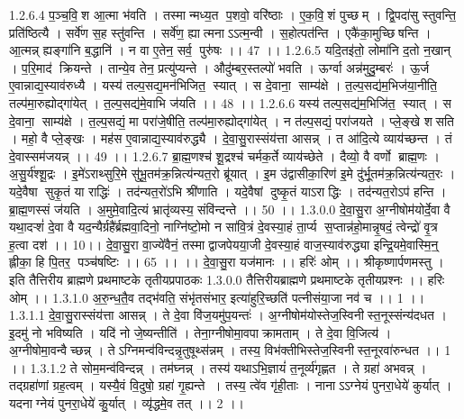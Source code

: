 1.2.6.4
प॒ञ्च॒वि॒॒श आ॒त्मा भ॑वति । तस्मान्मध्य॒त प॒शवो॒ वरि॑ष्ठाः । ए॒क॒वि॒॒शं पुच्छम् । द्वि॒पदा॑सु स्तुवन्ति॒ प्रति॑ष्ठित्यै । सर्वे॑ण स॒ह स्तु॑वन्ति । सर्वे॑ण॒ ह्यात्मनाऽऽत्म॒न्वी । स॒होत्पत॑न्ति । एकै॑का॒मुच्छि॑षन्ति । आ॒त्मन्न् ह्यङ्गा॑नि ब॒द्धानि॑ । न वा ए॒तेन॒ सर्व॒ पुरु॑षः ।। 47 ।।
1.2.6.5
यदि॒तइ॑तो॒ लोमा॑नि द॒तो न॒खान् । प॒रि॒माद॑ क्रियन्ते । तान्ये॒व तेन॒ प्रत्यु॑प्यन्ते । औदु॑म्बर॒स्तल्पो॑ भवति । ऊर्ग्वा अन्न॑मुदु॒म्बरः॑ । ऊ॒र्ज ए॒वान्नाद्य॒स्याव॑रुध्यै । यस्य॑ तल्प॒सद्य॒मन॑भिजित॒॒ स्यात् । स दे॒वाना॒॒ साम्य॑क्षे । त॒ल्प॒सद्य॑म॒भिज॑या॒नीति॒ तल्प॑मा॒रुह्योद्गा॑येत् । त॒ल्प॒सद्य॑मे॒वाभि ज॑यति ।। 48 ।।
1.2.6.6
यस्य॑ तल्प॒सद्य॑म॒भिजि॑त॒॒ स्यात् । स दे॒वाना॒॒ साम्य॑क्षे । त॒ल्प॒सद्यं॒ मा परा॑जे॒षीति॒ तल्प॑मा॒रुह्योद्गा॑येत् । न त॑ल्प॒सद्यं॒ परा॑जयते । प्ले॒ङ्खे श॑सति । महो॒ वै प्ले॒ङ्खः । मह॑स ए॒वान्नाद्य॒स्याव॑रुद्ध्यै । दे॒वा॒सु॒रास्संय॑त्ता आसन्न् । त आ॑दि॒त्ये व्याय॑च्छन्त । तं दे॒वास्सम॑जयन्न् ।। 49 ।।
1.2.6.7
ब्रा॒ह्म॒णश्च॑ शू॒द्रश्च॑ चर्मक॒र्ते व्याय॑च्छेते । दैव्यो॒ वै वर्णो ब्राह्म॒णः । अ॒सु॒र्य॑श्शू॒द्रः । इ॒मे॑ऽराथ्सुरि॒मे सु॑भू॒तम॑क्र॒न्नित्य॑न्यत॒रो ब्रू॑यात् । इ॒म उ॑द्वासीका॒रिण॑ इ॒मे दु॑र्भू॒तम॑क्र॒न्नित्य॑न्यत॒रः । यदे॒वैषा॑ सुकृ॒तं या राद्धिः॑ । तद॑न्यत॒रो॑ऽभि श्री॑णाति । यदे॒वैषां दुष्कृ॒तं याऽराद्धिः । तद॑न्यत॒रोऽप॑ हन्ति । ब्रा॒ह्म॒णस्सं ज॑यति । अ॒मुमे॒वादि॒त्यं भ्रातृ॑व्यस्य॒ संवि॑न्दन्ते ।। 50 ।।
1.3.0.0
दे॒वा॒सु॒रा अ॒ग्नीषोम॑योर्दे॒वा वै यथा॒दऱ्शं॑ दे॒वा वै यद॒न्यैर्ग्रहै॑र्ब्रह्मवा॒दिनो॒ नाग्नि॑ष्टो॒मो न सा॑वि॒त्रं दे॒वस्या॒हं ता॒र्प्य स॒प्तान्न॑हो॒मान्नृ॒षदं॒ त्वेन्द्रो॑ वृ॒त्र ह॒त्वा दश॑ ।। 10।। दे॒वा॒सु॒रा वा॒ज्ये॑वैनं॒ तस्माद्वाजपेयया॒जी दे॒वस्या॒हं वाज॒स्याव॑रुद्ध्या इन्द्रि॒यमे॒वास्मि॒न्॒ ह्लीका॒ हि पि॒तर॒ पञ्च॑षष्टिः ।। 65 ।। ।। दे॒वा॒सु॒रा यज॑मानः ।। हरिः॑ ओम् ।। श्रीकृष्णार्पणमस्तु । इति तैत्तिरीय ब्राह्मणे प्रथमाष्टके तृतीयप्रपाठकः
1.3.0.0
तैत्तिरीयब्राह्मणे प्रथमाष्टके तृतीयप्रश्नः ।। हरिः ओम् ।।
1.3.1.0
अ॒रु॒न्ध॒तै॒व तद्भ॑वति॒ संभृ॑तसंभार॒ इत्या॑हुरि॒च्छति॑ पत्नीसंया॒जा नव॑ च ।। 1 ।।
1.3.1.1
दे॒वा॒सु॒रास्संय॑त्ता आसन्न् । ते दे॒वा वि॑ज॒यमु॑प॒यन्तः॑ । अ॒ग्नीषोम॑योस्तेज॒स्विनीस्त॒नूस्संन्य॑दधत । इ॒दमु॑ नो भविष्यति । यदि॑ नो जे॒ष्यन्तीति॑ । तेना॒ग्नीषोमा॒वपाक्रामताम् । ते दे॒वा वि॒जित्य॑ । अ॒ग्नीषोमा॒वन्वैच्छन्न् । तेऽग्निमन्व॑विन्दन्नृ॒तुषूथ्स॑न्नम् । तस्य॒ विभ॑क्तीभिस्तेज॒स्विनीस्त॒नूरवा॑रुन्धत ।। 1 ।।
1.3.1.2
ते सोम॒मन्व॑विन्दन्न् । तम॑घ्नन्न् । तस्य॑ यथाऽभि॒ज्ञायं॑ त॒नूर्व्य॑गृह्णत । ते ग्रहा॑ अभवन्न् । तद्ग्रहा॑णां ग्रह॒त्वम् । यस्यै॒वं वि॒दुषो॒ ग्रहा॑ गृ॒ह्यन्ते । तस्य॒ त्वे॑व गृ॑ही॒ताः । नानाऽऽग्नेयं पुनरा॒धेये॑ कुर्यात् । यदनाग्नेयं पुनरा॒धेये॑ कु॒र्यात् । व्यृ॑द्धमे॒व तत् ।। 2 ।।
